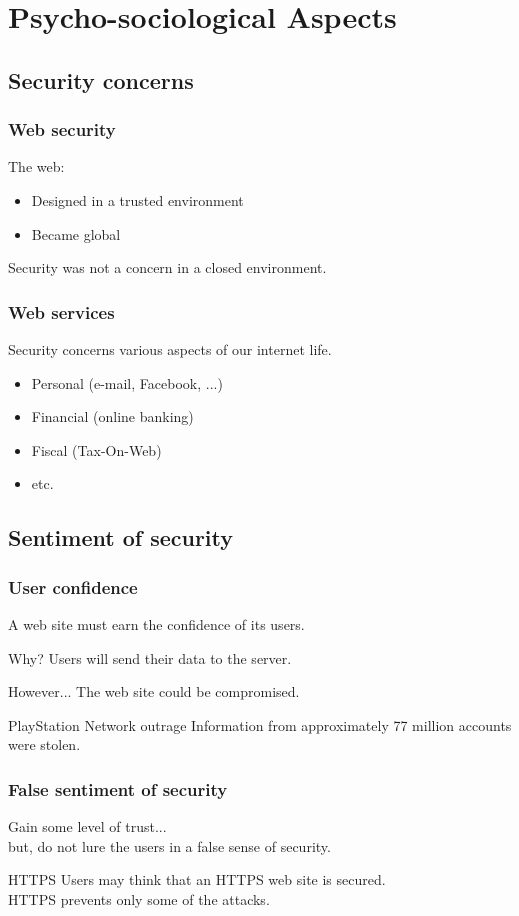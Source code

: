 \section{Psycho-sociological Aspects}

\subsection{Security concerns}

\begin{frame}
\frametitle{Web security}
The web:
\begin{itemize}
\item Designed in a trusted environment
\item Became global
\end{itemize}
Security was not a concern in a closed environment.
\end{frame}

\begin{frame}
\frametitle{Web services}
Security concerns various aspects of our internet life.
\begin{itemize}
\item Personal (e-mail, Facebook, ...)
\item Financial (online banking)
\item Fiscal (Tax-On-Web)
\item etc.
\end{itemize}
\end{frame}

\subsection{Sentiment of security}

\begin{frame}
\frametitle{User confidence}
A web site must earn the confidence of its users.
\begin{block}{Why?}
Users will send their data to the server.
\end{block}
\begin{block}{However...}
The web site could be compromised.
\end{block}
\begin{exampleblock}{PlayStation Network outrage}
Information from approximately 77 million accounts were stolen.
\end{exampleblock}
\end{frame}

\begin{frame}
\frametitle{False sentiment of security}
Gain some level of trust...
\\ but, do not lure the users in a false sense of security.
\begin{exampleblock}{HTTPS}
Users may think that an HTTPS web site is secured.
\\ HTTPS prevents only some of the attacks.
\end{exampleblock}
\end{frame}

